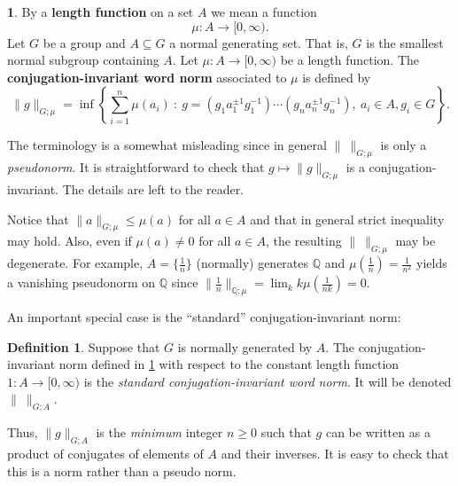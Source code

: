 \documentclass[12pt]{amsart}
\theoremstyle{definition}
\newtheorem{defn}[prop]{Definition}
\newtheorem{void}[prop]{}
\def\QQ{\ensuremath{\mathbb{Q}}}
\begin{document}
\begin{void}\label{V:word norms}
By a {\bf length function} on a set $A$ we mean a function 
\[
\mu \colon A \to [0,\infty).
\]
Let $G$ be a group and $A \subseteq G$ a normal generating set. 
That is, $G$ is the smallest normal subgroup containing $A$.
Let $\mu \colon A \to [0,\infty)$ be a length function.
The {\bf conjugation-invariant  word norm} associated to $\mu$ is defined by 
\begin{equation}
\label{eqn:def norm mu}
\| g \|_{G;\mu} =
\inf \left\{ \sum_{i=1}^n \mu(a_i) \ : \ g=(g_1 a_1^{\pm 1} g_1^{-1})\cdots (g_n a_n^{\pm 1} g_n^{-1}), \ a_i \in A, g_i \in G\right\}.
\end{equation}

The terminology is a somewhat misleading since in general $\| \ \|_{G;\mu}$ is only a {\em pseudonorm}.
It is straightforward to check that $g \mapsto \|g\|_{G;\mu}$ is  a conjugation-invariant.
The details are left to the reader.

Notice that  $\|a\|_{G;\mu} \leq \mu(a)$ for all $a \in A$ and that in general strict inequality may hold.
Also, even if $\mu(a) \neq 0$ for all $a \in A$, the resulting $\| \ \|_{G;\mu}$ may be degenerate.
For example, $A=\{ \tfrac{1}{n} \}$ (normally) generates $\QQ$ and $\mu(\tfrac{1}{n})=\tfrac{1}{n^2}$ yields a vanishing pseudonorm on $\QQ$ since $\| \tfrac{1}{n} \|_{\QQ;\mu} = \lim_k k \mu(\tfrac{1}{nk})=0$.
\end{void}





An important special case is the ``standard'' conjugation-invariant norm:

\begin{defn}\label{defn:standard word norm}
Suppose that $G$ is normally generated by $A$.
The conjugation-invariant norm defined in  \ref{V:word norms} with respect to the constant length function $1 \colon A \to [0,\infty)$ is the {\em standard conjugation-invariant word norm}.
It will be denoted $\| \ \|_{G;A}$.
\end{defn}

Thus, $\|g\|_{G;A}$ is the {\em minimum} integer $n \geq 0$ such that $g$ can be written as a product of conjugates of elements of $A$ and their inverses.
It is easy to check that this is a norm rather than a pseudo norm.
\end{document}
